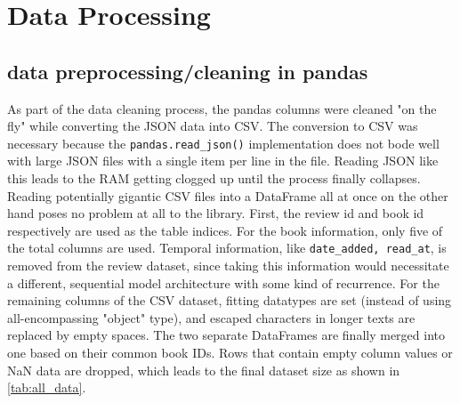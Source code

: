 \documentclass[10pt,final,journal,a4paper,oneside,twocolumn]{IEEEtran}
\begin{document}

\section{Data Processing}
\subsection{data preprocessing/cleaning in pandas}
As part of the data cleaning process, the pandas columns were cleaned "on the fly" while converting the JSON data into CSV.
The conversion to CSV was necessary because the \texttt{pandas.read_json()} implementation does not bode well with large JSON files with a single item per line in the file. Reading JSON like this leads to the RAM getting clogged up until the process finally collapses. Reading potentially gigantic CSV files into a DataFrame all at once on the other hand poses no problem at all to the library.
First, the review id and book id respectively are used as the table indices. For the book information, only five of the total  columns are used. Temporal information, like \texttt{date_added, read_at}, is removed from the review dataset, since taking this information would necessitate a different, sequential model architecture with some kind of recurrence.
For the remaining columns of the CSV dataset, fitting datatypes are set (instead of using all-encompassing "object" type), and escaped characters in longer texts are replaced by empty spaces.
The two separate DataFrames are finally merged into one based on their common book IDs. Rows that contain empty column values or NaN data are dropped, which leads to the final dataset size as shown in \autoref{tab:all_data}.
\end{document}

